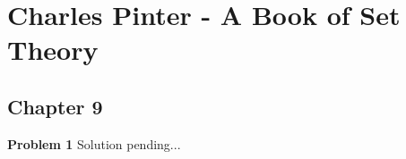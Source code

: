 \documentclass{article}
\begin{document}
\section*{Charles Pinter - A Book of Set Theory}
\subsection*{Chapter 9}

\textbf{Problem 1}
Solution pending...
\end{document}
